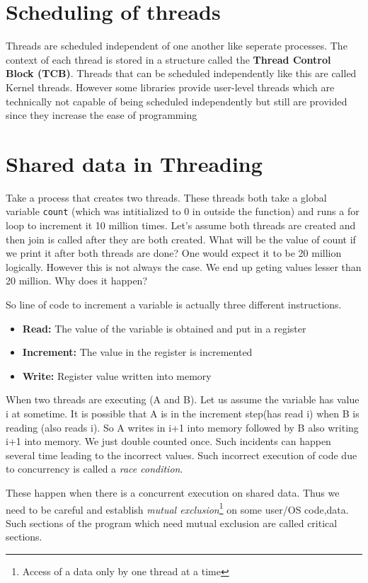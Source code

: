 \documentclass[12pt]{article}
\begin{document}
\section{Scheduling of threads}
Threads are scheduled independent of one another like seperate processes. The context of each thread is stored in a structure called the \textbf{Thread Control Block (TCB)}.
Threads that can be scheduled independently like this are called Kernel threads. However some libraries provide user-level threads which are technically not capable of being
scheduled independently but still are provided since they increase the ease of programming
\section{Shared data in Threading}
Take a process that creates two threads. These threads both take a global variable \texttt{count} (which was intitialized to 0 in outside the function) and runs a for loop to increment it 10 million times. Let's assume both
threads are created and then join is called after they are both created. What will be the value of count if we print it after both threads are done? One would expect it to be 20 million logically. However this is not always the case. We end up geting values lesser 
than 20 million. Why does it happen?

So line of code to increment a variable is actually three different instructions. 
\begin{itemize}[topsep=0pt, partopsep=0pt, itemsep=0pt, parsep=0pt]
    \item \textbf{Read:} The value of the variable is obtained and put in a register
    \item \textbf{Increment:} The value in the register is incremented
    \item \textbf{Write:} Register value written into memory 
\end{itemize} 

When two threads are executing (A and B). Let us assume the variable has value i at sometime. It is possible that A is in the increment step(has read i) when B is reading (also reads i). So A writes in i+1 into memory followed by B also writing i+1 into memory.
We just double counted once. Such incidents can happen several time leading to the incorrect values. Such incorrect execution of code due to concurrency is called a \textit{race condition}. 

These happen when there is a concurrent execution on shared data. Thus we need to be careful and establish \textit{mutual exclusion}\footnote{Access of a data only by one thread at a time} on 
some user/OS code,data. Such sections of the program which need mutual exclusion are called critical sections. 
\end{document}
